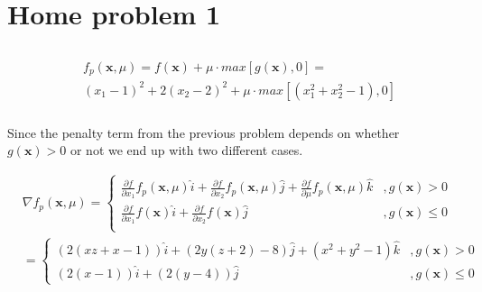 \documentclass{article}
\begin{document}
\section{Home problem 1}
\subsection{}
\subsubsection{}

\begin{align*}
  &f_\mathit{p}(\mathbf{x}, \mu) = f(\mathbf{x}) + \mu \cdot max \left[ g(\mathbf{x}), 0 \right]  = \\
  &(x_1 - 1)^2 + 2(x_2 - 2)^2 + \mu \cdot max \left[ (x_1^2 + x_2^2 - 1 ), 0 \right]
\end{align*}

\subsubsection{}

Since the penalty term from the previous problem depends on whether
$g(\mathbf{x}) > 0$ or not we end up with two different cases.

\begin{align*}
  & \nabla f_\mathit{p}(\mathbf{x}, \mu) =
  \begin{cases}
    \frac{\partial f}{\partial x_1}f_\mathit{p}(\mathbf{x}, \mu) \hat{i} +
    \frac{\partial f}{\partial x_2}f_\mathit{p}(\mathbf{x}, \mu) \hat{j} +
    \frac{\partial f}{\partial \mu}f_\mathit{p}(\mathbf{x}, \mu) \hat{k} &,g(\mathbf{x}) > 0 \\
    \frac{\partial f}{\partial x_1}f(\mathbf{x}) \hat{i} +
    \frac{\partial f}{\partial x_2}f(\mathbf{x}) \hat{j} &,g(\mathbf{x}) \leq 0 \\
  \end{cases} \\
  & =
  \begin{cases}
    (2 (x z+x-1)) \hat{i} + (2 y (z + 2) - 8) \hat{j} + (x^2 + y^2 - 1) \hat{k} &,g(\mathbf{x}) > 0 \\
    (2 (x - 1)) \hat{i} + (2 (y - 4)) \hat{j} &,g(\mathbf{x}) \leq 0
  \end{cases}
\end{align*}

\subsection{}
\end{document}
